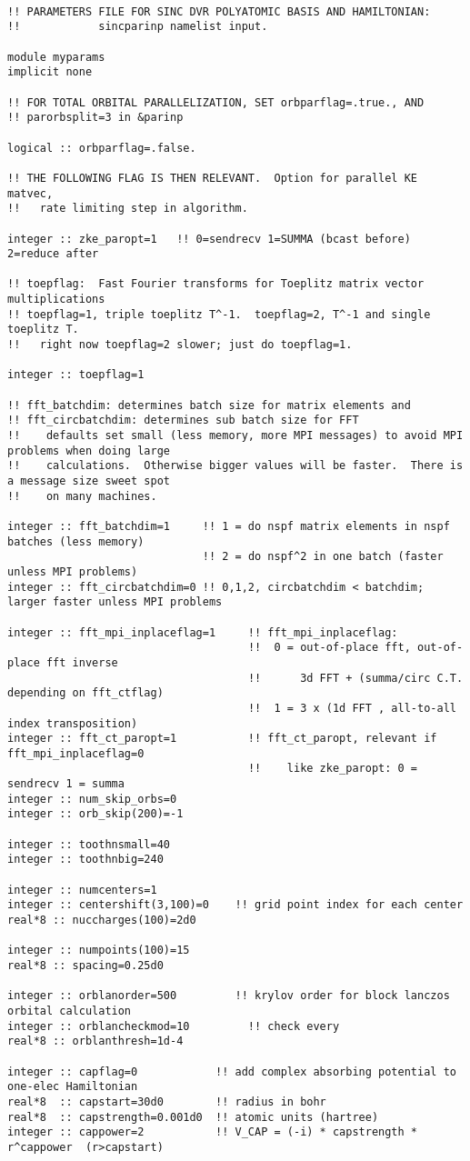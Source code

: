 \begin{verbatim}

!! PARAMETERS FILE FOR SINC DVR POLYATOMIC BASIS AND HAMILTONIAN:
!!            sincparinp namelist input.

module myparams
implicit none

!! FOR TOTAL ORBITAL PARALLELIZATION, SET orbparflag=.true., AND
!! parorbsplit=3 in &parinp

logical :: orbparflag=.false.

!! THE FOLLOWING FLAG IS THEN RELEVANT.  Option for parallel KE matvec,
!!   rate limiting step in algorithm.

integer :: zke_paropt=1   !! 0=sendrecv 1=SUMMA (bcast before) 2=reduce after

!! toepflag:  Fast Fourier transforms for Toeplitz matrix vector multiplications
!! toepflag=1, triple toeplitz T^-1.  toepflag=2, T^-1 and single toeplitz T. 
!!   right now toepflag=2 slower; just do toepflag=1.

integer :: toepflag=1

!! fft_batchdim: determines batch size for matrix elements and 
!! fft_circbatchdim: determines sub batch size for FFT 
!!    defaults set small (less memory, more MPI messages) to avoid MPI problems when doing large 
!!    calculations.  Otherwise bigger values will be faster.  There is a message size sweet spot
!!    on many machines.

integer :: fft_batchdim=1     !! 1 = do nspf matrix elements in nspf batches (less memory)
                              !! 2 = do nspf^2 in one batch (faster unless MPI problems)
integer :: fft_circbatchdim=0 !! 0,1,2, circbatchdim < batchdim; larger faster unless MPI problems

integer :: fft_mpi_inplaceflag=1     !! fft_mpi_inplaceflag:
                                     !!  0 = out-of-place fft, out-of-place fft inverse
                                     !!      3d FFT + (summa/circ C.T. depending on fft_ctflag)
                                     !!  1 = 3 x (1d FFT , all-to-all index transposition)
integer :: fft_ct_paropt=1           !! fft_ct_paropt, relevant if fft_mpi_inplaceflag=0
                                     !!    like zke_paropt: 0 = sendrecv 1 = summa
integer :: num_skip_orbs=0
integer :: orb_skip(200)=-1

integer :: toothnsmall=40
integer :: toothnbig=240

integer :: numcenters=1
integer :: centershift(3,100)=0    !! grid point index for each center
real*8 :: nuccharges(100)=2d0

integer :: numpoints(100)=15
real*8 :: spacing=0.25d0

integer :: orblanorder=500         !! krylov order for block lanczos orbital calculation
integer :: orblancheckmod=10         !! check every
real*8 :: orblanthresh=1d-4

integer :: capflag=0            !! add complex absorbing potential to one-elec Hamiltonian
real*8  :: capstart=30d0        !! radius in bohr
real*8  :: capstrength=0.001d0  !! atomic units (hartree)
integer :: cappower=2           !! V_CAP = (-i) * capstrength * r^cappower  (r>capstart)

\end{verbatim}
